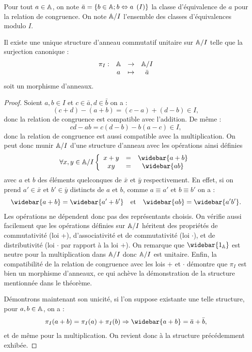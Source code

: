 \begin{nota}
Pour tout $a \in \mathbb{A}$, on note $\bar{a} = \{b \in \mathbb{A} ; b \Leftrightarrow a \pod{I} \}$ la classe d'équivalence de $a$ pour la relation de congruence.
On note $\mathbb{A}/I$ l'ensemble des classes d'équivalences modulo $I$.
\end{nota}

\begin{thm}
\label{thm:surjection}
Il existe une unique structure d'anneau commutatif unitaire sur $\mathbb{A}/I$ telle que la surjection canonique :
\[ \begin{array}{c c c c}
\pi_I : & \mathbb{A} & \to & \mathbb{A}/I \\
& a & \mapsto & \bar{a}
\end{array} \]
soit un morphisme d'anneaux.
\end{thm}

\begin{proof}
Soient $a,b \in I$ et $c \in \bar{a}, d \in \bar{b}$ on a :
\[ (c+d) - (a+b) = (c-a) + (d-b) \in I , \]
donc la relation de congruence est compatible avec l'addition. De même :
\[ cd - ab = c(d - b) - b(a - c) \in I , \]
donc la relation de congruence est aussi compatible avec la multiplication. 
On peut donc munir $\mathbb{A}/I$ d'une structure d'anneau avec les opérations ainsi définies
\[ \forall x, y \in \A/I \left \{ \begin{array}{c c c}
x + y & = & \widebar{a+b} \\
xy & = & \widebar{ab}
\end{array} \right. \]
avec $a$ et $b$ des éléments quelconques de $\bar{x}$ et $\bar{y}$ respectivement. 
En effet, si on prend  $a' \in \bar{x}$ et $b' \in \bar{y}$ distincts de $a$ et $b$, comme $a \equiv a'$ et $b \equiv b'$ on a :
\[ \widebar{a+b} = \widebar{a'+b'} \et \widebar{ab} = \widebar{a'b'} . \]
Les opérations ne dépendent donc pas des représentants choisis. 
On vérifie aussi facilement que les opérations définies sur $\mathbb{A}/I$ héritent des propriétés de commutativité (loi +), 
d'associativité et de commutativité (loi $\cdot$), et de distributivité (loi $\cdot$ par rapport à la loi $+$). \newline
On remarque que $\widebar{1_{\A}}$ est neutre pour la multiplication dans $\mathbb{A}/I$ donc $\mathbb{A}/I$ est unitaire.
Enfin, la compatibilité de la relation de congruence avec les lois $+$ et $\cdot$ démontre que
 $\pi_I$ est bien un morphisme d'anneaux, ce qui achève la démonstration de la structure mentionnée dans le théorème. \newline
 
Démontrons maintenant son unicité, si l'on suppose existante une telle structure, pour $a, b \in \mathbb{A}$, on a :
\[ \pi_I(a+b) = \pi_I(a) + \pi_I(b) \Rightarrow \widebar{a+b} = \bar{a} + \bar{b} , \]
et de même pour la multiplication. On revient donc à la structure précédemment exhibée. 
\end{proof}

